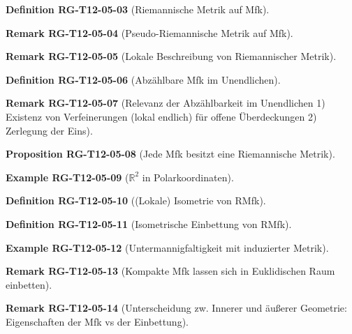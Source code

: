 \documentclass[10pt, letterpaper]{article}
\newcommand{\R}{\mathbb{R}}
\newcommand{\CustomHeading}[3]{%
  \par\medskip\noindent%
  \textbf{#1 #2} \textnormal{(#3)}.\enskip%
}
\newenvironment{DEF}[2]{\CustomHeading{Definition}{#1}{#2}}{}
\newenvironment{PROP}[2]{\CustomHeading{Proposition}{#1}{#2}}{}
\newenvironment{REM}[2]{\CustomHeading{Remark}{#1}{#2}}{}
\newenvironment{EXA}[2]{\CustomHeading{Example}{#1}{#2}}{}
\begin{document}
\begin{DEF}{RG-T12-05-03}{Riemannische Metrik auf Mfk}
\end{DEF}

\begin{REM}{RG-T12-05-04}{Pseudo-Riemannische Metrik auf Mfk}
\end{REM}

\begin{REM}{RG-T12-05-05}{Lokale Beschreibung von Riemannischer Metrik}
\end{REM}

\begin{DEF}{RG-T12-05-06}{Abzählbare Mfk im Unendlichen}
\end{DEF}

\begin{REM}{RG-T12-05-07}{Relevanz der Abzählbarkeit im Unendlichen
1) Existenz von Verfeinerungen (lokal endlich) für offene Überdeckungen
2) Zerlegung der Eins}
\end{REM}

\begin{PROP}{RG-T12-05-08}{Jede Mfk besitzt eine Riemannische Metrik}
\end{PROP}

\begin{EXA}{RG-T12-05-09}{$\R^2$ in Polarkoordinaten}
\end{EXA}

\begin{DEF}{RG-T12-05-10}{(Lokale) Isometrie von RMfk}
\end{DEF}

\begin{DEF}{RG-T12-05-11}{Isometrische Einbettung von RMfk}
\end{DEF}

\begin{EXA}{RG-T12-05-12}{Untermannigfaltigkeit mit induzierter Metrik}
\end{EXA}

\begin{REM}{RG-T12-05-13}{Kompakte Mfk lassen sich in Euklidischen Raum einbetten}
\end{REM}

\begin{REM}{RG-T12-05-14}{Unterscheidung zw. Innerer und äußerer Geometrie: Eigenschaften der Mfk vs der Einbettung}
\end{REM}
\end{document}

